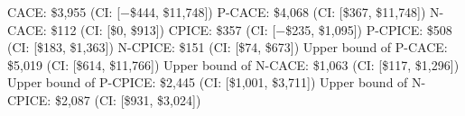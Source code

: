 CACE: \$3{,}955 (CI: [$-$\$444, \$11{,}748])
P-CACE: \$4{,}068 (CI: [\$367, \$11{,}748])
N-CACE: \$112 (CI: [\$0, \$913])
CPICE: \$357 (CI: [$-$\$235, \$1{,}095])
P-CPICE: \$508 (CI: [\$183, \$1{,}363])
N-CPICE: \$151 (CI: [\$74, \$673])
Upper bound of P-CACE: \$5{,}019 (CI: [\$614, \$11{,}766])
Upper bound of N-CACE: \$1{,}063 (CI: [\$117, \$1{,}296])
Upper bound of P-CPICE: \$2{,}445 (CI: [\$1{,}001, \$3{,}711])
Upper bound of N-CPICE: \$2{,}087 (CI: [\$931, \$3{,}024])
